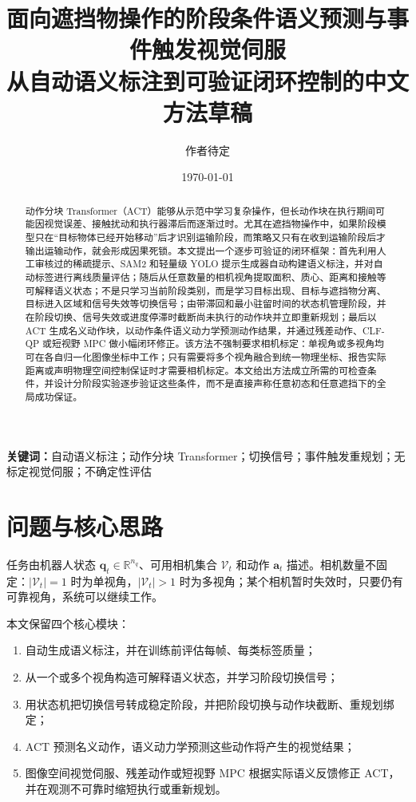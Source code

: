 \documentclass[UTF8,a4paper,11pt]{ctexart}
\title{面向遮挡物操作的阶段条件语义预测与事件触发视觉伺服\\
\large 从自动语义标注到可验证闭环控制的中文方法草稿}
\author{作者待定}
\date{\today}
\newcommand{\R}{\mathbb{R}}
\begin{document}
\maketitle

\begin{abstract}
动作分块 Transformer（ACT）能够从示范中学习复杂操作，但长动作块在执行期间可能因视觉误差、接触扰动和执行器滞后而逐渐过时。尤其在遮挡物操作中，如果阶段模型只在“目标物体已经开始移动”后才识别运输阶段，而策略又只有在收到运输阶段后才输出运输动作，就会形成因果死锁。本文提出一个逐步可验证的闭环框架：首先利用人工审核过的稀疏提示、SAM2 和轻量级 YOLO 提示生成器自动构建语义标注，并对自动标签进行离线质量评估；随后从任意数量的相机视角提取面积、质心、距离和接触等可解释语义状态；不是只学习当前阶段类别，而是学习目标出现、目标与遮挡物分离、目标进入区域和信号失效等切换信号；由带滞回和最小驻留时间的状态机管理阶段，并在阶段切换、信号失效或进度停滞时截断尚未执行的动作块并立即重新规划；最后以 ACT 生成名义动作块，以动作条件语义动力学预测动作结果，并通过残差动作、CLF-QP 或短视野 MPC 做小幅闭环修正。该方法不强制要求相机标定：单视角或多视角均可在各自归一化图像坐标中工作；只有需要将多个视角融合到统一物理坐标、报告实际距离或声明物理空间控制保证时才需要相机标定。本文给出方法成立所需的可检查条件，并设计分阶段实验逐步验证这些条件，而不是直接声称任意初态和任意遮挡下的全局成功保证。
\end{abstract}

\noindent\textbf{关键词：}自动语义标注；动作分块 Transformer；切换信号；事件触发重规划；无标定视觉伺服；不确定性评估

\section{问题与核心思路}

任务由机器人状态 $\bm q_t\in\R^{n_q}$、可用相机集合 $\mathcal V_t$ 和动作 $\bm a_t$ 描述。相机数量不固定：$|\mathcal V_t|=1$ 时为单视角，$|\mathcal V_t|>1$ 时为多视角；某个相机暂时失效时，只要仍有可靠视角，系统可以继续工作。

本文保留四个核心模块：
\begin{enumerate}[leftmargin=2.3em]
  \item 自动生成语义标注，并在训练前评估每帧、每类标签质量；
  \item 从一个或多个视角构造可解释语义状态，并学习阶段切换信号；
  \item 用状态机把切换信号转成稳定阶段，并把阶段切换与动作块截断、重规划绑定；
  \item ACT 预测名义动作，语义动力学预测这些动作将产生的视觉结果；
  \item 图像空间视觉伺服、残差动作或短视野 MPC 根据实际语义反馈修正 ACT，并在观测不可靠时缩短执行或重新规划。
\end{enumerate}
\end{document}
